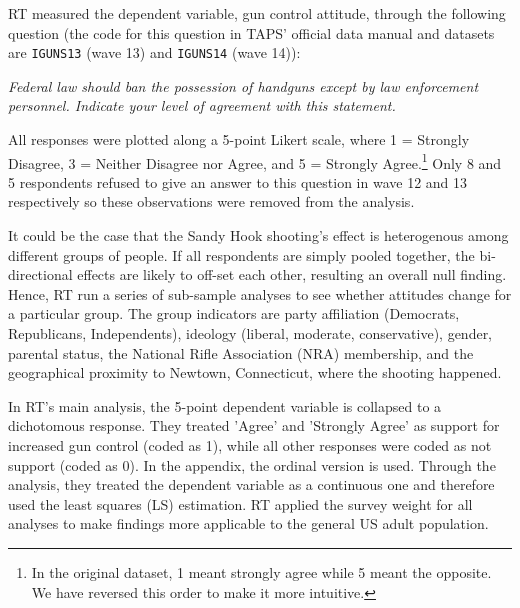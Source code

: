 \documentclass[11pt]{article}
\begin{document}
RT measured the dependent variable, gun control attitude, through the following question (the code for this question in TAPS’ official data manual and datasets are \texttt{IGUNS13} (wave 13) and \texttt{IGUNS14} (wave 14)):
\begin{displayquote}
\itshape
Federal law should ban the possession of handguns except by law enforcement personnel. Indicate your level of agreement with this statement.
\end{displayquote}
All responses were plotted along a 5-point Likert scale, where 1 = Strongly Disagree, 3 = Neither Disagree nor Agree, and 5 = Strongly Agree.\footnote{In the original dataset, 1 meant strongly agree while 5 meant the opposite. We have reversed this order to make it more intuitive.} Only 8 and 5 respondents refused to give an answer to this question in wave 12 and 13 respectively so these observations were removed from the analysis.

It could be the case that the Sandy Hook shooting’s effect is heterogenous among different groups of people. If all respondents are simply pooled together, the bi-directional effects are likely to off-set each other, resulting an overall null finding. Hence, RT run a series of sub-sample analyses to see whether attitudes change for a particular group. The group indicators are party affiliation (Democrats, Republicans, Independents), ideology (liberal, moderate, conservative), gender, parental status, the National Rifle Association (NRA) membership, and the geographical proximity to Newtown, Connecticut, where the shooting happened.  

In RT’s main analysis, the 5-point dependent variable is collapsed to a dichotomous response. They treated 'Agree' and 'Strongly Agree' as support for increased gun control (coded as 1), while all other responses were coded as not support (coded as 0). In the appendix, the ordinal version is used. Through the analysis, they treated the dependent variable as a continuous one and therefore used the least squares (LS) estimation. RT applied the survey weight for all analyses to make findings more applicable to the general US adult population.
\end{document}
